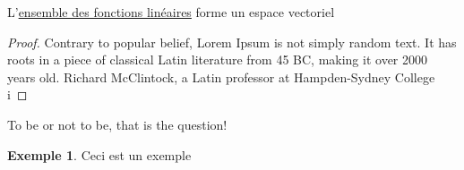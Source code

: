 \documentclass[12pt]{report}
\newcommand\todo[1]{\phantom{#1}}
\theoremstyle{definition}
\newtheorem*{example}{Exemple}
\begin{document}
    \begin{prop}
        \label{thm:ensemble_fonctions_lineaires_espace_Vectoriels}
        L'\hyperref[def:ensemble_fonctions_lineaires]{ensemble des fonctions linéaires} forme un espace vectoriel \todo{Add link here}
    \end{prop}
    \begin{proof}
        Contrary to popular belief, Lorem Ipsum is not simply random text. 
        It has roots in a piece of classical Latin literature from 45 BC, 
        making it over 2000 years old. Richard McClintock, a Latin professor at Hampden-Sydney College i
    \end{proof}

    \begin{attention}
        To be or not to be, that is the question!
    \end{attention}


    \begin{example}
        Ceci est un exemple
    \end{example}
\end{document}
